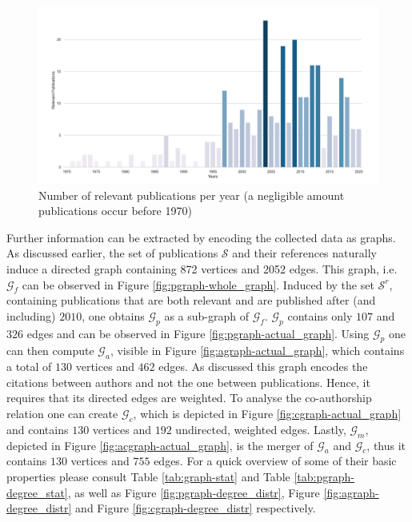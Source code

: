 \documentclass[11pt,a4paper]{book}
\theoremstyle{definition}
\theoremstyle{definition}
\theoremstyle{definition}
\theoremstyle{remark}
\newcommand{\xset}{\mathcal{S}}
\newcommand{\tgraph}{\mathcal{G}_{f}}
\newcommand{\pgraph}{\mathcal{G}_{p}}
\newcommand{\agraph}{\mathcal{G}_{a}}
\newcommand{\cgraph}{\mathcal{G}_{c}}
\newcommand{\acgraph}{\mathcal{G}_{m}}
\begin{document}
\begin{figure}[h]
\includegraphics[width=\textwidth]{relevant_publications_per_year.png}
\caption{Number of relevant publications per year (a negligible amount publications occur before 1970)}
\label{fig:pgraph-relevant_publications_per_year}
\end{figure}



Further information can be extracted by encoding the collected data as graphs. As discussed earlier, the set of publications $\xset$ and their references naturally induce a directed 
graph containing 872 vertices and 2052 edges. This graph, i.e.\ $\tgraph$ can be observed in Figure \ref{fig:pgraph-whole_graph}.
Induced by the set $\xset^r$, containing publications that are both relevant and are published after (and including) $2010$, one obtains $\pgraph$ as a sub-graph of $\tgraph$.
$\pgraph$ contains only $107$ and $326$ edges and can be observed in Figure \ref{fig:pgraph-actual_graph}.
Using $\pgraph$ one can then compute $\agraph$, visible in Figure \ref{fig:agraph-actual_graph}, which contains a total of $130$ vertices and $462$ edges. As discussed this graph encodes the citations between authors and not the one between publications. Hence, it requires that its directed edges are weighted. 
To analyse the co-authorship relation one can create $\cgraph$, which is depicted in Figure \ref{fig:cgraph-actual_graph} and contains $130$ vertices and $192$ undirected, weighted edges.
Lastly, $\acgraph$, depicted in Figure \ref{fig:acgraph-actual_graph}, is the merger of $\agraph$ and $\cgraph$, thus it contains $130$ vertices and $755$ edges. 
For a quick overview of some of their basic properties please consult Table \ref{tab:graph-stat} and Table  \ref{tab:pgraph-degree_stat}, as well as Figure \ref{fig:pgraph-degree_distr},  Figure \ref{fig:agraph-degree_distr} and  Figure \ref{fig:cgraph-degree_distr} respectively.
\end{document}
